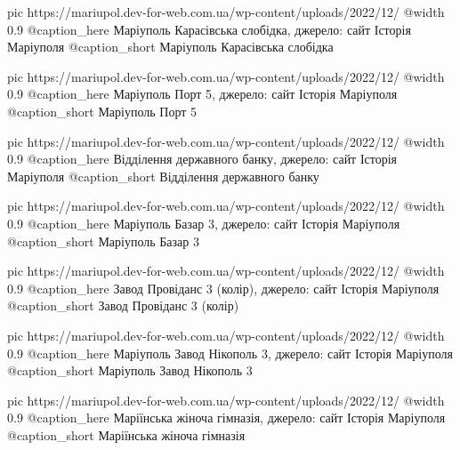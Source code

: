   pic https://mariupol.dev-for-web.com.ua/wp-content/uploads/2022/12/%
  @width 0.9
  @caption_here Маріуполь Карасівська слобідка, джерело: сайт Історія Маріуполя
  @caption_short Маріуполь Карасівська слобідка

  pic https://mariupol.dev-for-web.com.ua/wp-content/uploads/2022/12/%
  @width 0.9
  @caption_here Маріуполь Порт 5, джерело: сайт Історія Маріуполя
  @caption_short Маріуполь Порт 5

  pic https://mariupol.dev-for-web.com.ua/wp-content/uploads/2022/12/%
  @width 0.9
  @caption_here Відділення державного банку, джерело: сайт Історія Маріуполя
  @caption_short Відділення державного банку

  pic https://mariupol.dev-for-web.com.ua/wp-content/uploads/2022/12/%
  @width 0.9
  @caption_here Маріуполь Базар 3, джерело: сайт Історія Маріуполя
  @caption_short Маріуполь Базар 3

  pic https://mariupol.dev-for-web.com.ua/wp-content/uploads/2022/12/%
  @width 0.9
  @caption_here Завод Провіданс 3 (колір), джерело: сайт Історія Маріуполя
  @caption_short Завод Провіданс 3 (колір)

  pic https://mariupol.dev-for-web.com.ua/wp-content/uploads/2022/12/%
  @width 0.9
  @caption_here Маріуполь Завод Нікополь 3, джерело: сайт Історія Маріуполя
  @caption_short Маріуполь Завод Нікополь 3

  pic https://mariupol.dev-for-web.com.ua/wp-content/uploads/2022/12/%
  @width 0.9
  @caption_here Маріїнська жіноча гімназія, джерело: сайт Історія Маріуполя
  @caption_short Маріїнська жіноча гімназія


